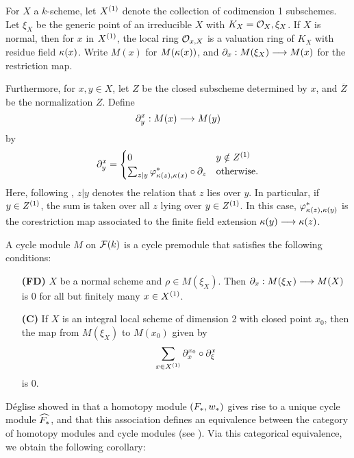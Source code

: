 For $X$ a $k$-scheme, let $\subsch{1}{X}$ denote the collection of 
codimension 1 subschemes. Let $\xi_X$ be the generic point of an
irreducible $X$ with $K_X = \O_X,\xi_X$. If $X$ is normal, then 
for $x$ in $\subsch{1}{X}$, the local ring $\O_{x,X}$ is a valuation 
ring of $K_X$ with residue field $\resf{x}$. Write $M(x)$ for 
$M(\resf{x})$, and $\res{x}: M(\xi_X) \to M(x)$ for the 
restriction map.

Furthermore, for $x, y \in X$, let $Z$ be the closed subscheme 
determined by $x$, and $\overline{Z}$ be the normalization $Z$.
Define
\[
\ptres{x}{y}: M(x) \to M(y)
\]
by
\[
\ptres{x}{y} = 
\begin{cases}
0 & y \notin \subsch{1}{Z} \\
\sum_{z|y} \phi_{\resf{z},\resf{x}}^* \comp \res{z} & \textrm{otherwise}.
\end{cases}
\]
Here, following \cite{Rost96}, $z|y$ denotes the relation that $z$ 
lies over $y$. In particular, if $y \in \subsch{1}{Z}$, the sum 
is taken over all $z$ lying over $y \in \subsch{1}{Z}$. In this
case, $\phi_{\resf{z},\resf{y}}^*$ is the corestriction map 
associated to the finite field extension $\resf{y} \to \resf{z}$.

\begin{defn}
A cycle module $M$ on $\fields(\basefield)$ is a cycle premodule that
satisfies the following conditions:

\begin{enumerate}[leftmargin=3em]
\item[\textbf{(FD)}]  
$X$ be a normal scheme and $\rho \in M(\xi_X)$. Then $\res{x}: 
M(\xi_X) \to M(X)$ is 0 for all but finitely many $x \in 
\subsch{1}{X}$.

\item[\textbf{(C)}]  If $X$ is an integral
local scheme of dimension 2 with closed point $x_0$, then the map 
from $M(\xi_X)$ to $M(x_0)$ given by
\[
\sum_{x \in \subsch{1}{X}} \ptres{x_0}{x} \comp \ptres{x}{\xi}
\]
is 0.
\end{enumerate}
\end{defn}

D\'eglise showed in \cite{DegModHom} that a homotopy module $(F_*, 
\deloop_*)$ gives rise to a unique cycle module $\assocCM{F_*}$,
and that this association defines an equivalence between the 
category of homotopy modules and cycle modules (see 
\cite[3.7]{DegModHom}). Via this categorical equivalence, we 
obtain the following corollary: 

